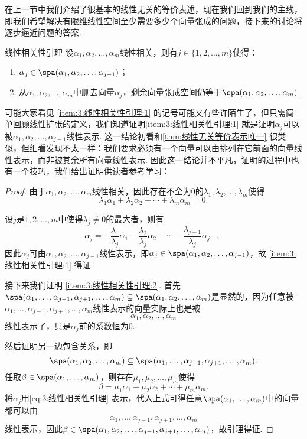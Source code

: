 在上一节中我们介绍了很基本的线性无关的等价表述，现在我们回到我们的主线，即我们希望解决有限维线性空间至少需要多少个向量张成的问题，接下来的讨论将逐步逼近问题的答案.
\begin{lemma}{}{线性相关性引理}
    设$\alpha_1,\alpha_2,\ldots,\alpha_m$线性相关，则有$j\in\{1,2,\ldots,m\}$使得：
    \begin{enumerate}
        \item \label{item:3:线性相关性引理:1}
              $\alpha_j \in \spa(\alpha_1,\alpha_2,\ldots,\alpha_{j-1})$；

        \item \label{item:3:线性相关性引理:2}
              从$\alpha_1,\alpha_2,\ldots,\alpha_m$中删去向量$\alpha_j$，剩余向量张成空间仍等于$\spa(\alpha_1,\alpha_2,\ldots,\alpha_m)$.
    \end{enumerate}
\end{lemma}
可能大家看见 \ref*{item:3:线性相关性引理:1} 的记号可能又有些许陌生了，但只需简单回顾线性扩张的定义，我们知道证明\ref*{item:3:线性相关性引理:1} 就是证明$\alpha_j$可以被$\alpha_1,\alpha_2,\ldots,\alpha_{j-1}$线性表示. 这一结论初看和\autoref{thm:线性无关等价表示唯一} 很类似，但细看发现不太一样：我们要求必须有一个向量可以由排列在它前面的向量线性表示，而非被其余所有向量线性表示. 因此这一结论并不平凡，证明的过程中也有一个技巧，我们给出证明供读者参考学习：

\begin{proof}
    由于$\alpha_1,\alpha_2,\ldots,\alpha_m$线性相关，因此存在不全为0的$\lambda_1,\lambda_2,\ldots,\lambda_m$使得
    \[\lambda_1\alpha_1+\lambda_2\alpha_2+\cdots+\lambda_m\alpha_m=0.\]

    设$j$是$1,2,\ldots,m$中使得$\lambda_j\neq 0$的最大者，则有
    \begin{equation}\label{eq:3:线性相关性引理}
        \alpha_j=-\frac{\lambda_1}{\lambda_j}\alpha_1-\frac{\lambda_2}{\lambda_j}\alpha_2-\cdots-\frac{\lambda_{j-1}}{\lambda_j}\alpha_{j-1}.
    \end{equation}
    因此$\alpha_j$可由$\alpha_1,\alpha_2,\ldots,\alpha_{j-1}$线性表示，即$\alpha_j\in\spa(\alpha_1,\alpha_2,\ldots,\alpha_{j-1})$，故 \ref*{item:3:线性相关性引理:1} 得证.

    接下来我们证明 \ref*{item:3:线性相关性引理:2}. 首先$\spa(\alpha_1,\ldots,\alpha_{j-1},\alpha_{j+1},\ldots,\alpha_m)\subseteq\spa(\alpha_1,\alpha_2,\ldots,\alpha_m)$是显然的，因为任意被$\alpha_1,\ldots,\alpha_{j-1},\alpha_{j+1},\ldots,\alpha_m$线性表示的向量实际上也是被
    \[\alpha_1,\alpha_2,\ldots,\alpha_m\]
    线性表示了，只是$\alpha_j$前的系数恒为0.

    然后证明另一边包含关系，即
    \[\spa(\alpha_1,\alpha_2,\ldots,\alpha_m)\subseteq\spa(\alpha_1,\ldots,\alpha_{j-1},\alpha_{j+1},\ldots,\alpha_m).\]
    任取$\beta\in\spa(\alpha_1,\ldots,\alpha_m)$，则存在$\mu_1,\mu_2,\ldots,\mu_m$使得
    \[\beta=\mu_1\alpha_1+\mu_2\alpha_2+\cdots+\mu_m\alpha_m.\]
    将$\alpha_j$用\autoref{eq:3:线性相关性引理} 表示，代入上式可得任意$\spa(\alpha_1,\ldots,\alpha_m)$中的向量都可以由\[\alpha_1,\ldots,\alpha_{j-1},\alpha_{j+1},\ldots,\alpha_m\]线性表示，因此$\beta\in\spa(\alpha_1,\alpha_2,\ldots,\alpha_{j-1},\alpha_{j+1},\ldots,\alpha_m)$，故引理得证.
\end{proof}

